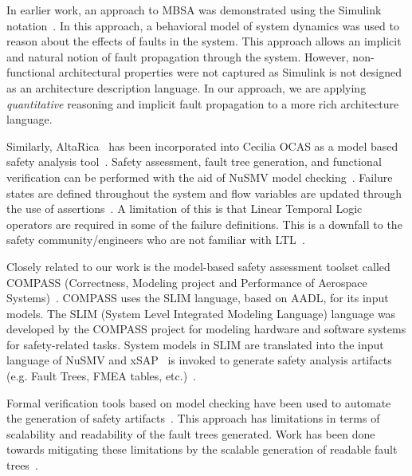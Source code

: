 In earlier work, an approach to MBSA was demonstrated using the Simulink\textsuperscript{\textregistered} notation~\cite{Joshi05:SafeComp,Joshi05:Dasc}. In this approach, a behavioral model of system dynamics was used to reason about the effects of faults in the system. This approach allows an implicit and natural notion of fault propagation through the system. However, non-functional architectural properties were not captured as Simulink is not designed as an architecture description language. In our approach, we are applying \textit{quantitative} reasoning and implicit fault propagation to a more rich architecture language.

Similarly, AltaRica~\cite{PROSVIRNOVA2013127} has been incorporated into Cecilia OCAS as a model based safety analysis tool~\cite{BieberERTS2018}. Safety assessment, fault tree generation, and functional verification can be performed with the aid of NuSMV model checking~\cite{symbAltaRica}. Failure states are defined throughout the system and flow variables are updated through the use of assertions~\cite{Bieber04safetyassessment}. A limitation of this is that Linear Temporal Logic operators are required in some of the failure definitions. This is a downfall to the safety community/engineers who are not familiar with LTL~\cite{Bieber04safetyassessment}.

Closely related to our work is the model-based safety assessment toolset called COMPASS (Correctness, Modeling project and Performance of Aerospace Systems)~\cite{10.1007/978-3-642-04468-7_15}. COMPASS uses the SLIM language, based on AADL, for its input models. The SLIM (System Level Integrated Modeling Language) language was developed by the COMPASS project for modeling hardware and software systems for safety-related tasks. System models in SLIM are translated into the input language of NuSMV and xSAP~\cite{DBLP:conf/tacas/BittnerBCCGGMMZ16} is invoked to generate safety analysis artifacts (e.g. Fault Trees, FMEA tables, etc.)~\cite{compass30toolset}.

Formal verification tools based on model checking have been used to automate the generation of safety artifacts~\cite{symbAltaRica,10.1007/978-3-540-75596-8-13, DBLP:conf/tacas/BittnerBCCGGMMZ16}. This approach has limitations in terms of scalability and readability of the fault trees generated. Work has been done towards mitigating these limitations by the scalable generation of readable fault trees~\cite{10.1007/978-3-319-11936-6-7}.

